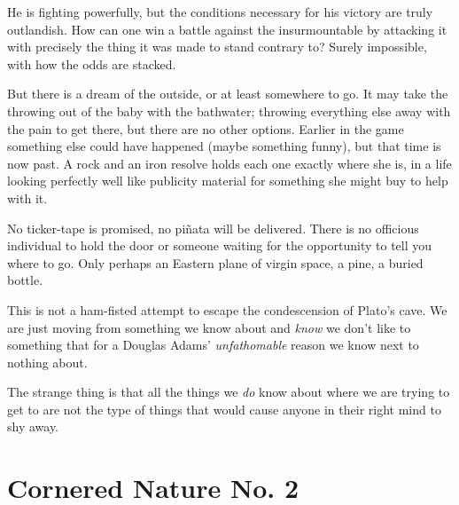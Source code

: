 \documentclass{book}
\begin{document}
He is fighting powerfully, but the conditions necessary for his victory are
truly outlandish. How can one win a battle against the insurmountable by
attacking it with precisely the thing it was made to stand contrary to? Surely
impossible, with how the odds are stacked.

But there is a dream of the outside, or at least somewhere to go. It may take
the throwing out of the baby with the bathwater; throwing everything else away
with the pain to get there, but there are no other options. Earlier in the game
something else could have happened (maybe something funny), but that time is
now past. A rock and an iron resolve holds each one exactly where she is, in a
life looking perfectly well like publicity material for something she might buy
to help with it.

No ticker-tape is promised, no piñata will be delivered. There is no officious
individual to hold the door or someone waiting for the opportunity to tell you
where to go. Only perhaps an Eastern plane of virgin space, a pine, a buried
bottle.

This is not a ham-fisted attempt to escape the condescension of Plato's cave.
We are just moving from something we know about and \emph{know} we don't like
to something that for a Douglas Adams' \emph{unfathomable} reason we know next
to nothing about.

The strange thing is that all the things we \emph{do} know about where we are
trying to get to are not the type of things that would cause anyone in their
right mind to shy away.

\chapter{Cornered Nature No. 2}
\end{document}
